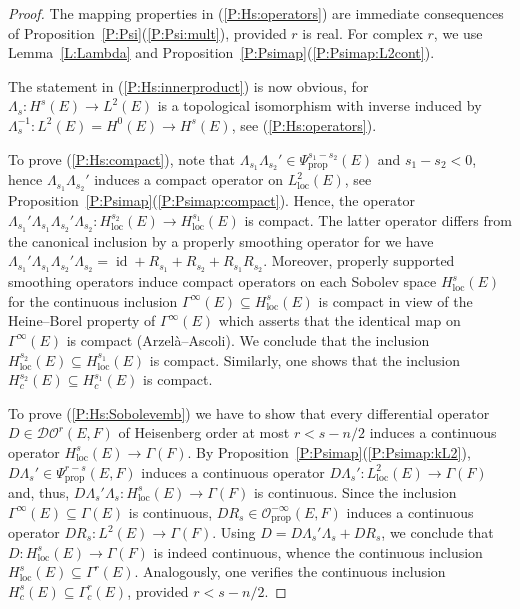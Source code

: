 \documentclass[reqno,12pt]{amsart}
\DeclareMathOperator{\id}{id}
\newcommand{\DO}{\mathcal D\mathcal O}
\newcommand\prop{\textrm{prop}}
\newcommand\loc{\textrm{loc}}
\newcommand\itemref[1]{(\ref{#1})}
\theoremstyle{plain}
\theoremstyle{definition}
\begin{document}
\begin{proof}
The mapping properties in \itemref{P:Hs:operators} are immediate consequences of Proposition~\ref{P:Psi}\itemref{P:Psi:mult}, provided $r$ is real.
For complex $r$, we use Lemma~\ref{L:Lambda} and Proposition~\ref{P:Psimap}\itemref{P:Psimap:L2cont}.


The statement in \itemref{P:Hs:innerproduct} is now obvious, for $\Lambda_s\colon H^s(E)\to L^2(E)$ is a topological isomorphism with inverse induced by $\Lambda_s^{-1}\colon L^2(E)=H^0(E)\to H^s(E)$, see \itemref{P:Hs:operators}.


To prove \itemref{P:Hs:compact}, note that $\Lambda_{s_1}\Lambda_{s_2}'\in\Psi^{s_1-s_2}_\prop(E)$ and $s_1-s_2<0$, hence $\Lambda_{s_1}\Lambda_{s_2}'$ induces a compact operator on $L^2_\loc(E)$, see Proposition~\ref{P:Psimap}\itemref{P:Psimap:compact}.
Hence, the operator $\Lambda_{s_1}'\Lambda_{s_1}\Lambda_{s_2}'\Lambda_{s_2}\colon H^{s_2}_\loc(E)\to H^{s_1}_\loc(E)$ is compact.
The latter operator differs from the canonical inclusion by a properly smoothing operator for we have $\Lambda_{s_1}'\Lambda_{s_1}\Lambda_{s_2}'\Lambda_{s_2}=\id+R_{s_1}+R_{s_2}+R_{s_1}R_{s_2}$.
Moreover, properly supported smoothing operators induce compact operators on each Sobolev space $H^s_\loc(E)$ for the continuous inclusion $\Gamma^\infty(E)\subseteq H^s_\loc(E)$ is compact in view of the Heine--Borel property of $\Gamma^\infty(E)$ which asserts that the identical map on $\Gamma^\infty(E)$ is compact (Arzel\`a--Ascoli).
We conclude that the inclusion $H^{s_2}_\loc(E)\subseteq H^{s_1}_\loc(E)$ is compact.
Similarly, one shows that the inclusion $H^{s_2}_c(E)\subseteq H^{s_1}_c(E)$ is compact.


To prove \itemref{P:Hs:Sobolevemb} we have to show that every differential operator $D\in\DO^r(E,F)$ of Heisenberg order at most $r<s-n/2$ induces a continuous operator $H^s_\loc(E)\to\Gamma(F)$.
By Proposition~\ref{P:Psimap}\itemref{P:Psimap:kL2}, $D\Lambda_s'\in\Psi_\prop^{r-s}(E,F)$ induces a continuous operator $D\Lambda_s'\colon L^2_\loc(E)\to\Gamma(F)$ and, thus, $D\Lambda_s'\Lambda_s\colon H^s_\loc(E)\to\Gamma(F)$ is continuous.
Since the inclusion $\Gamma^\infty(E)\subseteq\Gamma(E)$ is continuous, $DR_s\in\mathcal O^{-\infty}_\prop(E,F)$ induces a continuous operator $DR_s\colon L^2(E)\to\Gamma(F)$.
Using $D=D\Lambda_s'\Lambda_s+DR_s$, we conclude that $D\colon H^s_\loc(E)\to\Gamma(F)$ is indeed continuous, whence the continuous inclusion $H^s_\loc(E)\subseteq\Gamma^r(E)$.
Analogously, one verifies the continuous inclusion $H^s_c(E)\subseteq\Gamma_c^r(E)$, provided $r<s-n/2$.
\end{proof}
\end{document}
